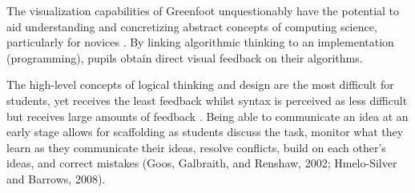 The visualization capabilities of Greenfoot unquestionably have the potential
to aid understanding and concretizing abstract concepts of computing science,
particularly for novices \cite{Hazzan2011} \cite{Sheard2009}. By linking
algorithmic thinking to an implementation (programming), pupils obtain direct
visual feedback on their algorithms.

The high-level concepts of logical thinking and design are the most difficult
for students, yet receives the least feedback whilst syntax is perceived as
less difficult but receives large amounts of feedback
\cite{ButlerMorgan2007}. Being able to communicate an idea at an early stage
allows for scaffolding as students discuss the task, monitor what they learn
as they communicate their ideas, resolve conflicts, build on each other’s
ideas, and correct mistakes (Goos, Galbraith, and Renshaw, 2002; Hmelo-Silver
and Barrows, 2008).

